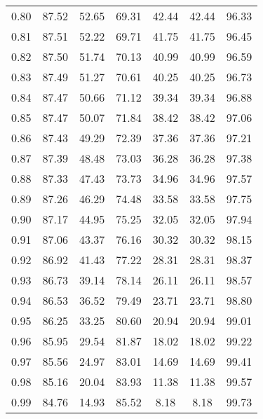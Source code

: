 \begin{tabular}{|c|c|c|c|c|c|c|}
      0.80 &     87.52 &     52.65 &      69.31 &   42.44 &      42.44 &         96.33 \\
      0.81 &     87.51 &     52.22 &      69.71 &   41.75 &      41.75 &         96.45 \\
      0.82 &     87.50 &     51.74 &      70.13 &   40.99 &      40.99 &         96.59 \\
      0.83 &     87.49 &     51.27 &      70.61 &   40.25 &      40.25 &         96.73 \\
      0.84 &     87.47 &     50.66 &      71.12 &   39.34 &      39.34 &         96.88 \\
      0.85 &     87.47 &     50.07 &      71.84 &   38.42 &      38.42 &         97.06 \\
      0.86 &     87.43 &     49.29 &      72.39 &   37.36 &      37.36 &         97.21 \\
      0.87 &     87.39 &     48.48 &      73.03 &   36.28 &      36.28 &         97.38 \\
      0.88 &     87.33 &     47.43 &      73.73 &   34.96 &      34.96 &         97.57 \\
      0.89 &     87.26 &     46.29 &      74.48 &   33.58 &      33.58 &         97.75 \\
      0.90 &     87.17 &     44.95 &      75.25 &   32.05 &      32.05 &         97.94 \\
      0.91 &     87.06 &     43.37 &      76.16 &   30.32 &      30.32 &         98.15 \\
      0.92 &     86.92 &     41.43 &      77.22 &   28.31 &      28.31 &         98.37 \\
      0.93 &     86.73 &     39.14 &      78.14 &   26.11 &      26.11 &         98.57 \\
      0.94 &     86.53 &     36.52 &      79.49 &   23.71 &      23.71 &         98.80 \\
      0.95 &     86.25 &     33.25 &      80.60 &   20.94 &      20.94 &         99.01 \\
      0.96 &     85.95 &     29.54 &      81.87 &   18.02 &      18.02 &         99.22 \\
      0.97 &     85.56 &     24.97 &      83.01 &   14.69 &      14.69 &         99.41 \\
      0.98 &     85.16 &     20.04 &      83.93 &   11.38 &      11.38 &         99.57 \\
      0.99 &     84.76 &     14.93 &      85.52 &    8.18 &       8.18 &         99.73 \\
\bottomrule
\end{tabular}
